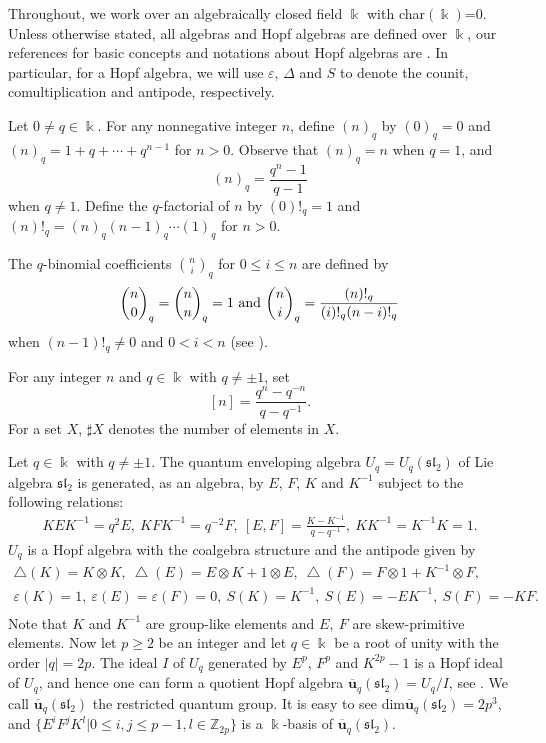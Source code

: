 \documentclass[10pt,oneside]{amsart}
\theoremstyle{definition}
\def\<{\leqslant}
\def\>{\geqslant}
\def\e{\varepsilon}
\begin{document}
Throughout, we work over an algebraically closed field $\Bbbk$ with char$(\Bbbk)$=0. Unless
otherwise stated, all algebras and Hopf algebras are
defined over $\Bbbk$, our references for basic concepts and notations about  Hopf algebras
are \cite{Ka, Mo}.
In particular, for a Hopf algebra, we will use $\e$, $\Delta$ and $S$ to denote the counit,
comultiplication and antipode, respectively.



Let $0\not=q\in \Bbbk$. For any nonnegative integer $n$, define $(n)_q$ by $(0)_q=0$ and $(n)_q=1+q+\cdots +q^{n-1}$ for $n>0$.
Observe that $(n)_q=n$ when $q=1$, and
$$
(n)_q=\frac{q^n-1}{q-1}
$$
when $q\not= 1$.
Define the $q$-factorial of $n$ by
$(0)!_q=1$ and
$(n)!_q=(n)_q(n-1)_q\cdots (1)_q$ for $n>0$.

The  $q$-binomial coefficients
$\binom{n}{i}_q$ for $0\<i\<n$
are defined by
$$\binom{n}{0}_q
=\binom{n}{n}_q
=1\ {\rm and} \
\binom{n}{i}_q
=\frac{(n)!_q}{(i)!_q(n-i)!_q}
$$
when
$(n-1)!_q\not = 0$ and $0<i<n$
(see \cite[Page 74]{Ka}).

For any integer $n$ and $q\in \Bbbk$ with $q\neq \pm 1$, set
$$
[n]=\frac{q^n-q^{-n}}{q-q^{-1}}.
$$
For a set $X$, $\sharp X$ denotes the number of elements in $X$.

Let $q\in \Bbbk$ with $q\neq\pm 1$.
The quantum enveloping algebra  $U_q=U_q(\mathfrak{sl}_2)$ of Lie algebra $\mathfrak{sl}_2$
is generated, as an algebra, by $E$, $F$, $K$ and $K^{-1}$ subject to the following relations:
$$\begin{array}{c}
KEK^{-1}=q^2E, \ KFK^{-1}=q^{-2}F, \ [E,F]=\frac{K-K^{-1}}{q-q^{-1}}, \ KK^{-1}=K^{-1}K=1.
\end{array}$$
$U_q$ is a Hopf algebra with the coalgebra structure and the antipode given by
$$\begin{array}{c}
\bigtriangleup(K)=K\otimes K, \ \bigtriangleup(E)=E\otimes K+1\otimes E, \ \bigtriangleup(F)=F\otimes 1+K^{-1}\otimes F,\\
\varepsilon(K)=1, \ \varepsilon(E)=\varepsilon(F)=0, \ S(K)=K^{-1}, \ S(E)=-EK^{-1}, \ S(F)=-KF.\\
\end{array}$$
Note that $K$ and $K^{-1}$ are group-like elements and $E,\ F$ are skew-primitive elements.
Now let $p\>2$ be an integer and let $q\in \Bbbk$ be a root of unity with the order $|q|=2p$. The ideal $I$ of $U_q$ generated by $E^p$, $F^p$ and $K^{2p}-1$
is a Hopf ideal of $U_q$, and hence one can form a quotient Hopf algebra
$\mathbf{\overline{u}}_q(\mathfrak{sl_2})=U_q/I$, see \cite{Suter,Xiao}. We call $\mathbf{\overline{u}}_q(\mathfrak{sl_2})$ the restricted quantum group. It is easy to see  dim$\mathbf{\overline{u}}_q(\mathfrak{sl_2})=2p^3$, and $\{E^iF^jK^l|0\<i,j\<p-1,l\in \mathbb{Z}_{2p}\}$ is a $\Bbbk$-basis of $\mathbf{\overline{u}}_q(\mathfrak{sl_2})$.
\end{document}
